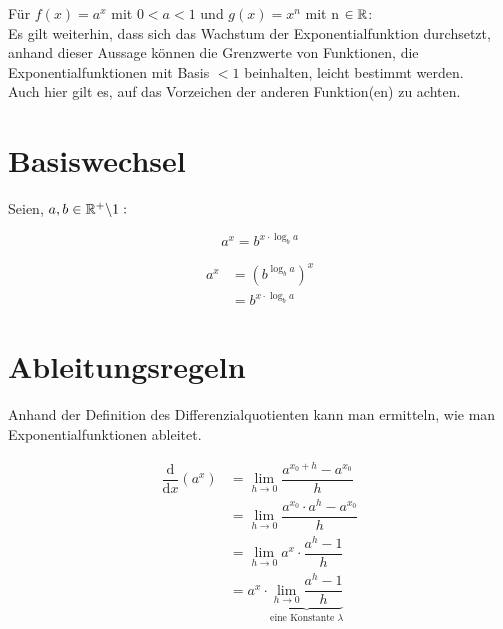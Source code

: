 Für $f(x)= a^x$ mit $0<a<1$ und $g(x)=x^n$ mit n $\in \mathbb{R}$:\\
Es gilt weiterhin, dass sich das Wachstum der Exponentialfunktion durchsetzt, anhand dieser Aussage können die Grenzwerte von Funktionen, die Exponentialfunktionen mit Basis $<1$ beinhalten, leicht bestimmt werden.\\
\danger Auch hier gilt es, auf das Vorzeichen der anderen Funktion(en) zu achten.

		\section{Basiswechsel}

Seien, $a,b\in\mathbb{R}^+\backslash1:$
\begin{Theorem}
$$a^x=b^{ x\cdot\log_b a}$$
\end{Theorem}
\begin{Beweis}
\begin{align*}
a^x&=(b^{\log_b a})^x\\
&=b^{x\cdot\log_b a }
\end{align*}
\end{Beweis}

		\section{Ableitungsregeln}

Anhand der Definition des Differenzialquotienten kann man ermitteln, wie man Exponentialfunktionen ableitet.

\begin{Beweis}
\begin{align*}
\dfrac{\text{d}}{\text{d}x}(a^x) &=\lim\limits_{h\to0}\dfrac{a^{{x_0}+h}-a^{x_0}}{h}\\
&=\lim\limits_{h\to0}\dfrac{a^{x_0}\cdot a^h-a^{x_0}}{h}\\
&=\lim\limits_{h\to0}a^x\cdot\dfrac{a^h-1}{h}\\
&=a^x\cdot\underbrace{\lim\limits_{h\to0}\dfrac{a^h-1}{h}}_{\text{eine Konstante }\lambda}
\end{align*}
\end{Beweis}

